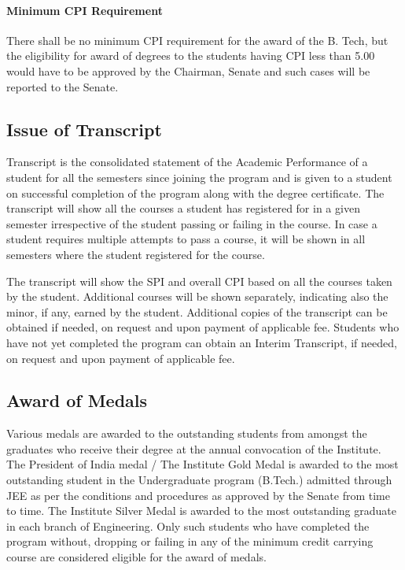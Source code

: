 \paragraph{Minimum CPI Requirement} There shall be no minimum CPI requirement for the award of the B. Tech, but the eligibility for award of degrees to the students having CPI less than 5.00 would have to be approved by the Chairman, Senate and such cases will be reported to the Senate. 

\subsection{Issue of Transcript}

Transcript is the consolidated statement of the Academic Performance of a student for all the semesters since joining the program and is given to a student on successful completion of the program along with the degree certificate.
The transcript will show all the courses a student has registered for in a given semester irrespective of the student passing or failing in the course. In case a student requires multiple attempts to pass a course, it will be shown in all semesters where the student registered for the course.

The transcript will show the SPI and overall CPI based on all the courses taken by the student. Additional courses will be shown separately, indicating also the minor, if any, earned by the student. Additional copies of the transcript can be obtained if needed, on request and upon payment of applicable fee. Students who have not yet completed the program can obtain an Interim Transcript, if needed, on request and upon payment of applicable fee.

\subsection{Award of Medals}

Various medals are awarded to the outstanding students from amongst the graduates who receive their degree at the annual convocation of the Institute. The President of India medal / The Institute Gold Medal is awarded to the most outstanding student in the Undergraduate program (B.Tech.) admitted through JEE as per the conditions and procedures as approved by the Senate from time to time. The Institute Silver Medal is awarded to the most outstanding graduate in each branch of Engineering. Only such students who have completed the program without, dropping or failing in any of the minimum credit carrying course are considered eligible for the award of medals.